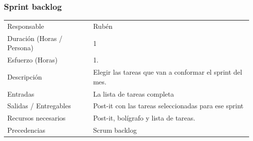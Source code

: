 \subsubsection{Sprint backlog}
\begin{table}[H]
    \begin{center}
        \begin{tabular}{l p{8cm}}
            Responsable                           & Rub\'{e}n \\
            Duraci\'{o}n (Horas / Persona)        & 1 \\ 
            Esfuerzo (Horas)                      & 1. \\
            Descripci\'{o}n                       & Elegir las tareas que van a conformar el sprint del mes. \\
            Entradas                              & La lista de tareas completa\\
            Salidas / Entregables                 & Post-it con las tareas seleccionadas para ese sprint \\
            Recursos necesarios                   & Post-it, bol\'igrafo y lista de tareas. \\
            Precedencias                          & Scrum backlog \\
        \end{tabular}
    \end{center}
    
\end{table}

